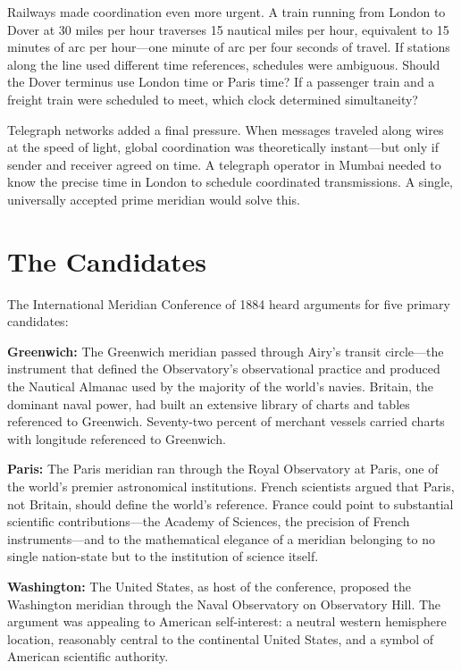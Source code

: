 Railways made coordination even more urgent. A train running from London to Dover at 30 miles per hour traverses 15 nautical miles per hour, equivalent to 15 minutes of arc per hour---one minute of arc per four seconds of travel. If stations along the line used different time references, schedules were ambiguous. Should the Dover terminus use London time or Paris time? If a passenger train and a freight train were scheduled to meet, which clock determined simultaneity?

Telegraph networks added a final pressure. When messages traveled along wires at the speed of light, global coordination was theoretically instant---but only if sender and receiver agreed on time. A telegraph operator in Mumbai needed to know the precise time in London to schedule coordinated transmissions. A single, universally accepted prime meridian would solve this.

\section{The Candidates}

The International Meridian Conference of 1884 heard arguments for five primary candidates:

\textbf{Greenwich:} The Greenwich meridian passed through Airy's transit circle---the instrument that defined the Observatory's observational practice and produced the Nautical Almanac used by the majority of the world's navies. Britain, the dominant naval power, had built an extensive library of charts and tables referenced to Greenwich. Seventy-two percent of merchant vessels carried charts with longitude referenced to Greenwich.

\textbf{Paris:} The Paris meridian ran through the Royal Observatory at Paris, one of the world's premier astronomical institutions. French scientists argued that Paris, not Britain, should define the world's reference. France could point to substantial scientific contributions---the Academy of Sciences, the precision of French instruments---and to the mathematical elegance of a meridian belonging to no single nation-state but to the institution of science itself.

\textbf{Washington:} The United States, as host of the conference, proposed the Washington meridian through the Naval Observatory on Observatory Hill. The argument was appealing to American self-interest: a neutral western hemisphere location, reasonably central to the continental United States, and a symbol of American scientific authority.

